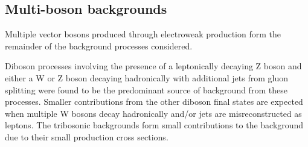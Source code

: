 \subsection{Multi-boson backgrounds}
Multiple vector bosons produced through electroweak production form the remainder of the background processes considered.

Diboson processes involving the presence of a leptonically decaying Z boson and either a W or Z boson decaying hadronically with additional jets from gluon splitting were found to be the predominant source of background from these processes.
Smaller contributions from the other diboson final states are expected when multiple W bosons decay hadronically and/or jets are misreconstructed as leptons.
The tribosonic backgrounds form small contributions to the background due to their small production cross sections.